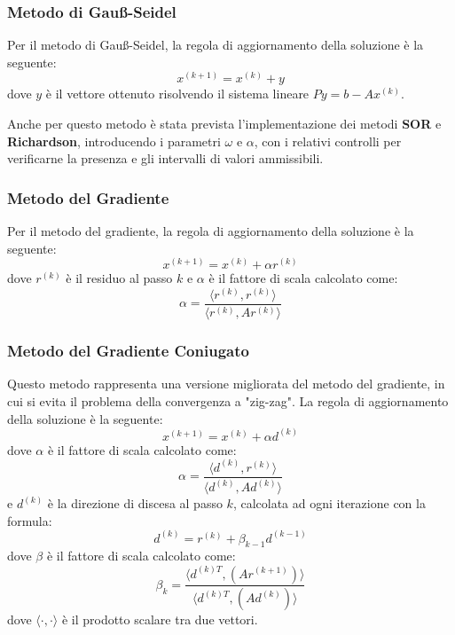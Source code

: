 \subsubsection{Metodo di Gauß-Seidel}
Per il metodo di Gauß-Seidel, la regola di aggiornamento della soluzione è la seguente:
\begin{equation}
    x^{(k+1)} = x^{(k)} + y
\end{equation}
dove $y$ è il vettore ottenuto risolvendo il sistema lineare $Py = b - Ax^{(k)}$.

Anche per questo metodo è stata prevista l'implementazione dei metodi \textbf{SOR}
e \textbf{Richardson}, introducendo i parametri $\omega$ e $\alpha$, con i relativi
controlli per verificarne la presenza e gli intervalli di valori ammissibili.

\subsubsection{Metodo del Gradiente}
Per il metodo del gradiente, la regola di aggiornamento della soluzione è la seguente:
\begin{equation}
    x^{(k+1)} = x^{(k)} + \alpha r^{(k)}
\end{equation}
dove $r^{(k)}$ è il residuo al passo $k$ e $\alpha$ è il fattore di scala calcolato
come:
\begin{equation}
    \alpha = \frac{\langle r^{(k)}, r^{(k)}\rangle}{\langle r^{(k)}, Ar^{(k)}\rangle}
\end{equation}

\subsubsection{Metodo del Gradiente Coniugato}
Questo metodo rappresenta una versione migliorata del metodo del gradiente, in
cui si evita il problema della convergenza a "zig-zag". La regola di aggiornamento
della soluzione è la seguente:
\begin{equation}
    x^{(k+1)} = x^{(k)} + \alpha d^{(k)}
\end{equation}
dove $\alpha$ è il fattore di scala calcolato come:
\begin{equation}
    \alpha = \frac{\langle d^{(k)}, r^{(k)}\rangle}{\langle d^{(k)}, Ad^{(k)}\rangle}
\end{equation}
e $d^{(k)}$ è la direzione di discesa al passo $k$, calcolata ad ogni iterazione
con la formula:
\begin{equation}
    d^{(k)} = r^{(k)} + \beta_{k-1} d^{(k-1)}
\end{equation}
dove $\beta$ è il fattore di scala calcolato come:
\begin{equation}
    \beta_k = \frac{\langle d^{(k)T}, (Ar^{(k + 1)})\rangle}{\langle d^{(k)T}, (Ad^{(k)})\rangle}
\end{equation}
dove $\langle \cdot, \cdot \rangle$ è il prodotto scalare tra due vettori.

